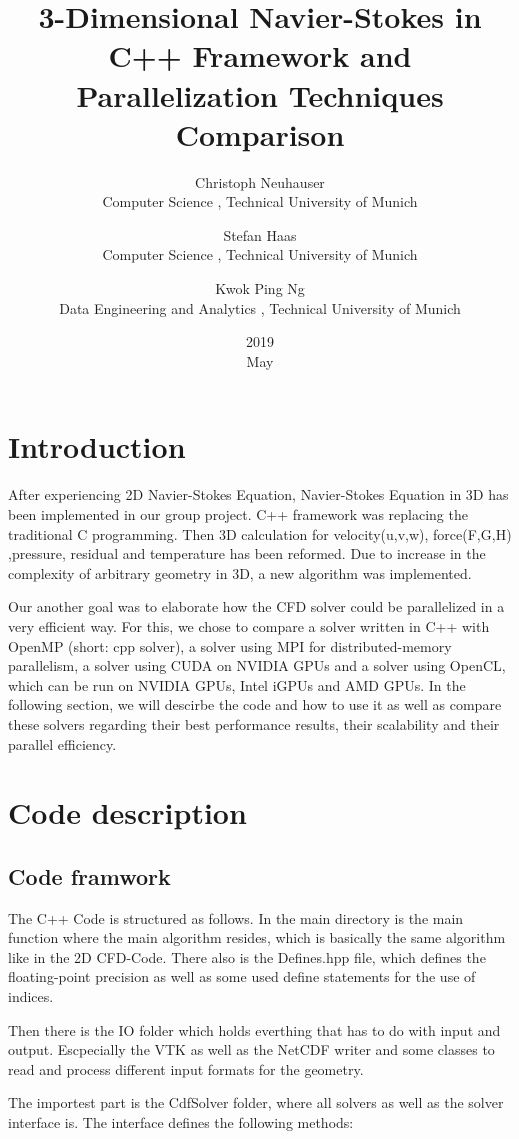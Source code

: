 \documentclass{article}%
\title{3-Dimensional Navier-Stokes in C++ Framework and Parallelization Techniques Comparison }
\date{2019\\ May}
\author{Christoph Neuhauser\\ Computer Science , Technical University of Munich 
\and Stefan Haas\\ Computer Science , Technical University of Munich
\and Kwok Ping Ng\\ Data Engineering and Analytics , Technical University of Munich}
\begin{document}
\maketitle

\section{Introduction}

After experiencing 2D Navier-Stokes Equation, Navier-Stokes Equation in 3D has been implemented in our group project.  C++ framework was replacing the traditional C programming. Then 3D calculation for velocity(u,v,w), force(F,G,H) ,pressure, residual and temperature has been reformed.  Due to increase in the complexity of arbitrary geometry in 3D, a new algorithm was implemented.

Our another goal was to elaborate how the CFD solver could be parallelized in a very efficient way. For this, we chose to compare a solver written in C++ with OpenMP (short: cpp solver), a solver using MPI for distributed-memory parallelism, a solver using CUDA on NVIDIA GPUs and a solver using OpenCL, which can be run on NVIDIA GPUs, Intel iGPUs and AMD GPUs. In the following section, we will descirbe the code and how to use it as well as compare these solvers regarding their best performance results, their scalability and their parallel efficiency.

\section{Code description}
\subsection{Code framwork}
The C++ Code is structured as follows. In the main directory is the main function where the main algorithm resides, which is basically the same algorithm like in the 2D CFD-Code. There also is the Defines.hpp file, which defines the floating-point precision as well as some used define statements for the use of indices.

Then there is the IO folder which holds everthing that has to do with input and output. Escpecially the VTK as well as the NetCDF writer and some classes to read and process different input formats for the geometry.

The importest part is the CdfSolver folder, where all solvers as well as the solver interface is. The interface defines the following methods:\pagebreak
\end{document}
